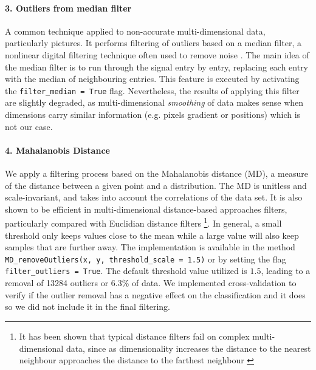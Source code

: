 \documentclass[fleqn,9 pt]{SelfArx} %
\begin{document}
\begin{sloppypar}
\paragraph{3. Outliers from median filter} A common technique applied to non-accurate multi-dimensional data, particularly pictures. It performs filtering of outliers based on a median filter, a nonlinear digital filtering technique often used to remove noise \cite{wang1999progressive}. The main idea of the median filter is to run through the signal entry by entry, replacing each entry with the median of neighbouring entries. This feature is executed by activating the \texttt{filter\_median = True} flag. Nevertheless, the results of applying this filter are slightly degraded, as multi-dimensional \textit{smoothing} of data makes sense when dimensions carry similar information (e.g. pixels gradient or positions) which is not our case.

\paragraph{4. Mahalanobis Distance} We apply a filtering process based on the Mahalanobis distance (MD)\cite{de2000mahalanobis}, a measure of the distance between a given point and a distribution. The MD is unitless and scale-invariant, and takes into account the correlations of the data set. It is also shown to be efficient in multi-dimensional distance-based approaches filters, particularly compared with Euclidian distance filters \footnote{It has been shown that typical distance filters fail on complex multi-dimensional data, since as dimensionality increases the distance to the nearest neighbour approaches the distance to the farthest neighbour \cite{beyer1999nearest}}. In general, a small threshold only keeps values close to the mean while a large value will also keep samples that are further away. The implementation is available in the method \texttt{MD\_removeOutliers(x, y, threshold\_scale = 1.5)} or by setting the flag \texttt{filter\_outliers = True}. The default threshold value utilized is $1.5$, leading to a removal of 13284 outliers or 6.3\% of data. We implemented cross-validation to verify if the outlier removal has a negative effect on the classification and it does so we did not include it in the final filtering.


\end{sloppypar}
\end{document}
